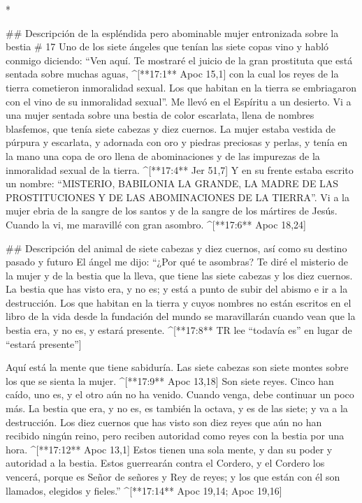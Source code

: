 \begin{paracols}{2}
\begin{english}
\end{english}
\switchcolumn[0]*

## Descripción de la espléndida pero abominable mujer entronizada sobre la bestia
# 17
 Uno de los siete ángeles que tenían las siete copas vino y habló conmigo diciendo: “Ven aquí. Te mostraré el juicio de la gran prostituta que está sentada sobre muchas aguas, ^[**17:1** Apoc 15,1]  con la cual los reyes de la tierra cometieron inmoralidad sexual. Los que habitan en la tierra se embriagaron con el vino de su inmoralidad sexual”.  Me llevó en el Espíritu a un desierto. Vi a una mujer sentada sobre una bestia de color escarlata, llena de nombres blasfemos, que tenía siete cabezas y diez cuernos.  La mujer estaba vestida de púrpura y escarlata, y adornada con oro y piedras preciosas y perlas, y tenía en la mano una copa de oro llena de abominaciones y de las impurezas de la inmoralidad sexual de la tierra. ^[**17:4** Jer 51,7]  Y en su frente estaba escrito un nombre: “MISTERIO, BABILONIA LA GRANDE, LA MADRE DE LAS PROSTITUCIONES Y DE LAS ABOMINACIONES DE LA TIERRA”.  Vi a la mujer ebria de la sangre de los santos y de la sangre de los mártires de Jesús. Cuando la vi, me maravillé con gran asombro. ^[**17:6** Apoc 18,24]

## Descripción del animal de siete cabezas y diez cuernos, así como su destino pasado y futuro
 El ángel me dijo: “¿Por qué te asombras? Te diré el misterio de la mujer y de la bestia que la lleva, que tiene las siete cabezas y los diez cuernos.  La bestia que has visto era, y no es; y está a punto de subir del abismo e ir a la destrucción. Los que habitan en la tierra y cuyos nombres no están escritos en el libro de la vida desde la fundación del mundo se maravillarán cuando vean que la bestia era, y no es, y estará presente. ^[**17:8** TR lee “todavía es” en lugar de “estará presente”]

 Aquí está la mente que tiene sabiduría. Las siete cabezas son siete montes sobre los que se sienta la mujer. ^[**17:9** Apoc 13,18]  Son siete reyes. Cinco han caído, uno es, y el otro aún no ha venido. Cuando venga, debe continuar un poco más.  La bestia que era, y no es, es también la octava, y es de las siete; y va a la destrucción.  Los diez cuernos que has visto son diez reyes que aún no han recibido ningún reino, pero reciben autoridad como reyes con la bestia por una hora. ^[**17:12** Apoc 13,1]  Estos tienen una sola mente, y dan su poder y autoridad a la bestia.  Estos guerrearán contra el Cordero, y el Cordero los vencerá, porque es Señor de señores y Rey de reyes; y los que están con él son llamados, elegidos y fieles.” ^[**17:14** Apoc 19,14; Apoc 19,16]


\end{paracols}
